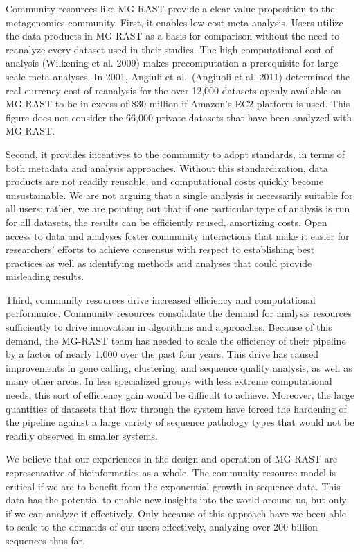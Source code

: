 \documentclass[letterpaper,10pt,english]{sphinxmanual}
\begin{document}
Community resources like MG-RAST provide a clear value proposition to
the metagenomics community. First, it enables low-cost meta-analysis.
Users utilize the data products in MG-RAST as a basis for comparison
without the need to reanalyze every dataset used in their studies. The
high computational cost of analysis (Wilkening et al. 2009) makes
precomputation a prerequisite for large-scale meta-analyses. In 2001,
Angiuli et al. (Angiuoli et al. 2011) determined the real currency cost
of reanalysis for the over 12,000 datasets openly available on MG-RAST
to be in excess of \$30 million if Amazon’s EC2 platform is used. This
figure does not consider the 66,000 private datasets that have been
analyzed with MG-RAST.

Second, it provides incentives to the community to adopt standards, in
terms of both metadata and analysis approaches. Without this
standardization, data products are not readily reusable, and
computational costs quickly become unsustainable. We are not arguing
that a single analysis is necessarily suitable for all users; rather, we
are pointing out that if one particular type of analysis is run for all
datasets, the results can be efficiently reused, amortizing costs. Open
access to data and analyses foster community interactions that make it
easier for researchers’ efforts to achieve consensus with respect to
establishing best practices as well as identifying methods and analyses
that could provide misleading results.

Third, community resources drive increased efficiency and computational
performance. Community resources consolidate the demand for analysis
resources sufficiently to drive innovation in algorithms and approaches.
Because of this demand, the MG-RAST team has needed to scale the
efficiency of their pipeline by a factor of nearly 1,000 over the past
four years. This drive has caused improvements in gene calling,
clustering, and sequence quality analysis, as well as many other areas.
In less specialized groups with less extreme computational needs, this
sort of efficiency gain would be difficult to achieve. Moreover, the
large quantities of datasets that flow through the system have forced
the hardening of the pipeline against a large variety of sequence
pathology types that would not be readily observed in smaller systems.

We believe that our experiences in the design and operation of MG-RAST
are representative of bioinformatics as a whole. The community resource
model is critical if we are to benefit from the exponential growth in
sequence data. This data has the potential to enable new insights into
the world around us, but only if we can analyze it effectively. Only
because of this approach have we been able to scale to the demands of
our users effectively, analyzing over 200 billion sequences thus far.
\end{document}
